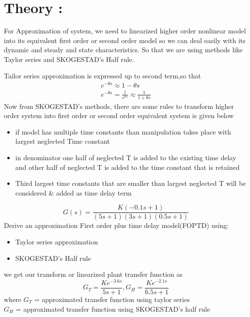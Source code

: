\message{ !name(lab1.tex)}\documentclass[a4paper,12pt,openany]{book}
\begin{document}
\section{Theory :}
For Approximation of system, we need to linearized higher order nonlinear model
into its equivalent first order or second order model so we can deal easily with
its dynamic and steady and state characteristics. So that we are using methods
like Taylor series and SKOGESTAD's Half rule. \par 
\noident Tailor series approximation is expressed up to second term,so that
\begin{eqnarray}
  e^{-\theta s} \approx 1 - \theta s\\
   e^{-\theta s} = \frac{1}{e^{\theta s}} \approx \frac{1}{ 1 + \theta s}
\end{eqnarray}
Now from SKOGESTAD's methods, there are some rules to transform higher order
system into first order or second order equivalent system is given below
\begin{itemize}
\item if model has multiple time constants than manipulation takes place with
    largest neglected Time constant
\item in denominator one half of neglected T is added to the existing time
      delay and other half of neglected T is added to the time constant that is
      retained
\item Third largest time constants that are smaller than largest neglected
        T will be considered \& added as time delay term
\end{itemize}
\begin{equation}
  G(s) = \frac{K(-0.1s + 1)}{(5s+1)(3s+1)(0.5s+1)}
  \end{equation}
  \noindent Derive an approximation First order plus time delay model(FOPTD) using:
  \begin{itemize}
  \item Taylor series approximation
  \item SKOGESTAD's Half rule
  \end{itemize}
  we get our transform or linearized plant transfer function as
  \begin{equation}
  G_{T}= \frac{Ke^{-3.6s}}{5s + 1},  G_H = \frac{Ke^{-2.1s}}{6.5s + 1}  
  \end{equation}
  where $G_T$ = approximated transfer function using taylor series\\
  $G_H$ =  approximated transfer function using SKOGESTAD's half rule\\
\end{document}
